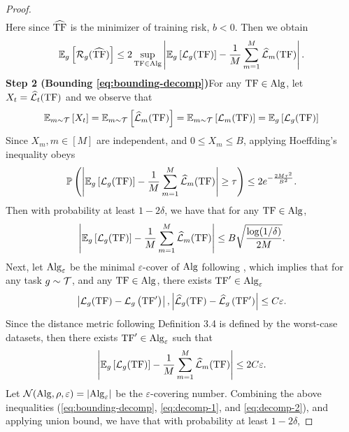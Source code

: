 \documentclass[10pt]{article}
\theoremstyle{plain}
\theoremstyle{definition}
\theoremstyle{remark}
\begin{document}
\begin{proof}
\begin{align*}
\end{align*}
Here since $\widehat{\mathrm{TF}}$ is the minimizer of training risk, $b<0$. Then we obtain
\begin{align}
\mathbb{E}_{g}\left[\mathcal{R}_{g}(\widehat{\mathrm{TF}})\right] \leq 2 \sup _{\mathrm{TF} \in \mathrm{Alg}}\left|\mathbb{E}_{g}\left[\mathcal{L}_{g}(\mathrm{TF})\right]-\frac{1}{M} \sum_{m=1}^M \widehat{\mathcal{L}}_m(\mathrm{TF})\right| .\label{eq:bounding-decomp}
\end{align}
\textbf{Step 2 (Bounding \eqref{eq:bounding-decomp})}For any $\mathrm{TF} \in \mathrm{Alg}$, let $X_t=\widehat{\mathcal{L}}_t(\mathrm{TF})$ and we observe that
\begin{align*}
\mathbb{E}_{m \sim \mathcal{T}}\left[X_t\right]=\mathbb{E}_{m \sim \mathcal{T}}\left[\widehat{\mathcal{L}}_m(\mathrm{TF})\right]=\mathbb{E}_{m \sim \mathcal{T}}\left[\mathcal{L}_m(\mathrm{TF})\right]=\mathbb{E}_{g}\left[\mathcal{L}_{g}(\mathrm{TF})\right]
\end{align*}
Since $X_m, m \in[M]$ are independent, and $0 \leq X_m \leq B$, applying Hoeffding's inequality obeys
\begin{align*}
\mathbb{P}\left(\left|\mathbb{E}_{g}\left[\mathcal{L}_{g}(\mathrm{TF})\right]-\frac{1}{M} \sum_{m=1}^M \widehat{\mathcal{L}}_m(\mathrm{TF})\right| \geq \tau\right) \leq 2 e^{-\frac{2 M \tau^2}{B^2}} .
\end{align*}
Then with probability at least $1-2 \delta$, we have that for any $\mathrm{TF} \in \mathrm{Alg}$,
\begin{align}
\left|\mathbb{E}_{g}\left[\mathcal{L}_{g}(\mathrm{TF})\right]-\frac{1}{M} \sum_{m=1}^M \widehat{\mathcal{L}}_m(\mathrm{TF})\right| \leq B \sqrt{\frac{\log (1 / \delta)}{2 M}} . \label{eq:decomp-1}
\end{align}
Next, let $\mathrm{Alg}_{\varepsilon}$ be the minimal $\varepsilon$-cover of $\mathrm{Alg}$ following , which implies that for any task $g \sim \mathcal{T}$, and any $\mathrm{TF} \in \mathrm{Alg}$, there exists $\mathrm{TF}^{\prime} \in \mathrm{Alg}_{\varepsilon}$
\begin{align}
\left|\mathcal{L}_{g}(\mathrm{TF})-\mathcal{L}_{g}\left(\mathrm{TF}^{\prime}\right)\right|,\left|\widehat{\mathcal{L}}_{g}(\mathrm{TF})-\widehat{\mathcal{L}}_{g}\left(\mathrm{TF}{ }^{\prime}\right)\right| \leq C \varepsilon . \label{eq:decomp-2}
\end{align}
Since the distance metric following Definition 3.4 is defined by the worst-case datasets, then there exists $\mathrm{TF}^{\prime} \in \mathrm{Alg}_{\varepsilon}$ such that
\begin{align*}
\left|\mathbb{E}_{g}\left[\mathcal{L}_{g}(\mathrm{TF})\right]-\frac{1}{M} \sum_{m=1}^M \widehat{\mathcal{L}}_m(\mathrm{TF})\right| \leq 2 C \varepsilon .
\end{align*}
Let $\mathcal{N}(\mathrm{Alg}, \rho, \varepsilon)=\left|\mathrm{Alg}_{\varepsilon}\right|$ be the $\varepsilon$-covering number. Combining the above inequalities (\eqref{eq:bounding-decomp}, \eqref{eq:decomp-1}, and \eqref{eq:decomp-2}), and applying union bound, we have that with probability at least $1-2 \delta$,

\end{proof}
\end{document}
